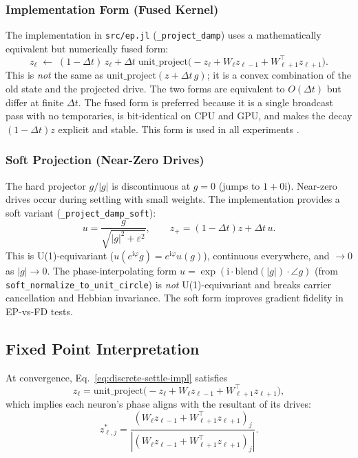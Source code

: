 \documentclass[11pt]{article}
\newcommand{\im}{\mathrm{i}}
\newcommand{\dt}{\Delta t}
\newcommand{\unitproject}{\mathrm{unit\_project}}
\begin{document}
\subsubsection{Implementation Form (Fused Kernel)}
The implementation in \texttt{src/ep.jl} (\texttt{\_project\_damp}) uses a mathematically equivalent but numerically fused form:
\begin{equation}\label{eq:discrete-settle-impl}
z_\ell \;\leftarrow\; (1-\dt)\,z_\ell + \dt \;\unitproject\Big( -z_\ell + W_\ell z_{\ell-1} + W_{\ell+1}^\top z_{\ell+1} \Big).
\end{equation}
This is \emph{not} the same as $\unitproject(z + \dt\,g)$; it is a convex combination of the old state and the projected drive. The two forms are equivalent to $O(\dt)$ but differ at finite $\dt$. The fused form is preferred because it is a single broadcast pass with no temporaries, is bit-identical on CPU and GPU, and makes the decay $(1-\dt)z$ explicit and stable. This form is used in all experiments \citep{olin2021deep}.

\subsubsection{Soft Projection (Near-Zero Drives)}
The hard projector $g/|g|$ is discontinuous at $g=0$ (jumps to $1+0\im$). Near-zero drives occur during settling with small weights. The implementation provides a soft variant (\texttt{\_project\_damp\_soft}):
\begin{equation}\label{eq:soft-project}
u = \frac{g}{\sqrt{|g|^2 + \varepsilon^2}}, \qquad
z_+ = (1-\dt)z + \dt\, u.
\end{equation}
This is U(1)-equivariant ($u(e^{\im\varphi}g) = e^{\im\varphi}u(g)$), continuous everywhere, and $\to 0$ as $|g|\to 0$. The phase-interpolating form $u = \exp(\im \cdot \mathrm{blend}(|g|) \cdot \angle g)$ (from \texttt{soft\_normalize\_to\_unit\_circle}) is \emph{not} U(1)-equivariant and breaks carrier cancellation and Hebbian invariance. The soft form improves gradient fidelity in EP-vs-FD tests.

\subsection{Fixed Point Interpretation}

At convergence, Eq.~\ref{eq:discrete-settle-impl} satisfies
\begin{equation}
z_\ell = \unitproject\Big( -z_\ell + W_\ell z_{\ell-1} + W_{\ell+1}^\top z_{\ell+1} \Big),
\end{equation}
which implies each neuron's phase aligns with the resultant of its drives:
\begin{equation}
z_{\ell,j}^* = \frac{ (W_\ell z_{\ell-1} + W_{\ell+1}^\top z_{\ell+1})_j }{ |(W_\ell z_{\ell-1} + W_{\ell+1}^\top z_{\ell+1})_j| }.
\end{equation}
\end{document}
